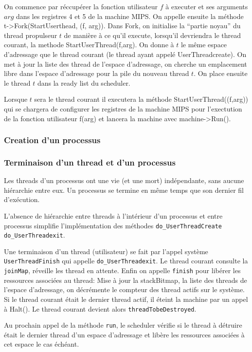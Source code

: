 \documentclass[11pt]{article}
\begin{document}
On commence par réccupérer la fonction utilisateur $f$ à executer et ses arguments $arg$ dans les registres 4 et 5 de la machine MIPS.
On appelle ensuite la méthode t->Fork(StartUserthead, (f, arg)).
Dans Fork, on initialise la ``partie noyau'' du thread propulseur $t$ de manière
à ce qu'il execute, lorsqu'il devriendra le thread courant, la methode
StartUserThread(f,arg). On donne à $t$ le même espace d'adressage que le
thread courant (le thread ayant appelé UserThreadcreate). On met à jour
la liste des thread de l'espace d'adressage, on cherche un emplacement
libre dans l'espace d'adressage pour la pile du nouveau thread $t$.
On place ensuite le thread $t$ dans la ready list du scheduler.

Lorsque $t$ sera le thread courant il executera la méthode StartUserThread((f,arg))
qui se chargera de configurer les registres de la machine MIPS pour l'exectution
de la fonction utilisateur f(arg) et lancera la machine avec machine->Run(). 

\subsubsection{Creation d'un processus}


\subsubsection{Terminaison d'un thread et d'un processus}
Les threads d'un processus ont une vie (et une mort) indépendante, sans aucune hiérarchie entre eux.
Un processus se termine en même temps que son dernier fil d'exécution.

L'absence de hiérarchie entre threads à l'intérieur d'un processus et entre processus simplifie
l'implémentation des méthodes \texttt{do\_UserThreadCreate} \texttt{do\_UserThreadexit}.

Une terminaison d'un thread (utilisateur) se fait par l'appel système \texttt{UserThreadFinish} qui appelle \texttt{do\_UserThreadexit}. Le thread courant consulte la \texttt{joinMap}, réveille les thread en attente. Enfin on appelle \texttt{finish} pour libérer les ressources associées au thread:
Mise à jour la stackBitmap, la liste des threads de l'espace d'adressage, on décrémente le compteur des
thread actifs sur le système. Si le thread courant était le dernier thread actif, il éteint la machine par un appel à Halt(). Le thread courant devient alors \texttt{threadTobeDestroyed}.

Au prochain appel de la méthode \texttt{run}, le scheduler vérifie si le thread à détruire était le dernier
thread d'un espace d'adressage et libère les ressources associées à cet espace le cas échéant.
\end{document}
